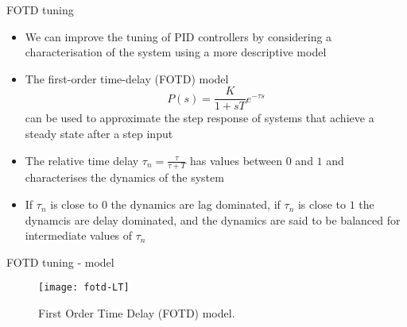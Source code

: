 \documentclass{beamer-control}
\begin{document}
\begin{frame}{FOTD tuning}
	\begin{itemize}
		\item We can improve the tuning of PID controllers by considering a characterisation of the system using a more descriptive model
		\item The first-order time-delay (FOTD) model
		\[P(s) = \frac{K}{1+sT}e^{-\tau s}\]
		can be used to approximate the step response of systems that achieve a steady state after a step input
		\item The relative time delay $\tau_n = \tfrac{\tau}{\tau+T}$
		has values between $0$ and $1$ and characterises the dynamics of the system
		\item If $\tau_n$ is close to $0$ the dynamics are lag dominated, if $\tau_n$ is close to $1$ the dynamcis are delay dominated, and the dynamics are said to be balanced for intermediate values of $\tau_n$
	\end{itemize}
\end{frame}




\begin{frame}{FOTD tuning - model}
\begin{figure}
	\centering
	\texttt{[image: fotd-LT]}
	\caption{First Order Time Delay (FOTD) model.}
\end{figure}
\end{frame}
\end{document}
